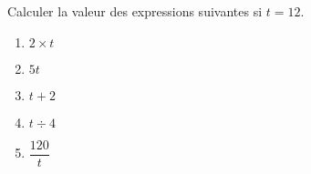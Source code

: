
\begin{exercice}\label{exo2smath-0193}

    Calculer la valeur des expressions suivantes si \( t=12\).
    \begin{multicols}{3}
        \begin{enumerate}
            \item
                \( 2\times t\)
            \item
                \( 5t\)
            \item
                \( t+2\)
            \item
                \( t\div 4\)
            \item
                \( \dfrac{ 120 }{ t }\)
        \end{enumerate}
    \end{multicols}

\end{exercice}
